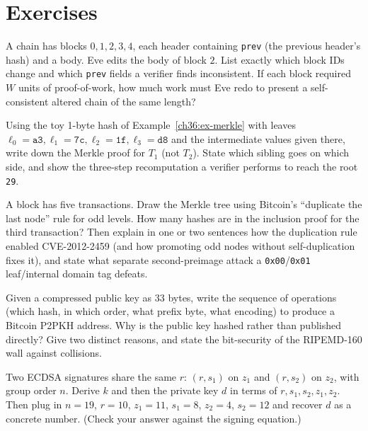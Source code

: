 \section*{Exercises}

\begin{exercise}
\label{ch36:ex-cascade}
A chain has blocks $0,1,2,3,4$, each header containing \texttt{prev} (the previous header's hash) and a body. Eve edits the body of block $2$. List exactly which block IDs change and which \texttt{prev} fields a verifier finds inconsistent. If each block required $W$ units of proof-of-work, how much work must Eve redo to present a self-consistent altered chain of the same length?
\end{exercise}

\begin{exercise}
\label{ch36:ex-merkleproof}
Using the toy 1-byte hash of Example~\ref{ch36:ex-merkle} with leaves $\ell_0=\texttt{a3},\ell_1=\texttt{7c},\ell_2=\texttt{1f},\ell_3=\texttt{d8}$ and the intermediate values given there, write down the Merkle proof for $T_1$ (not $T_2$). State which sibling goes on which side, and show the three-step recomputation a verifier performs to reach the root \texttt{29}.
\end{exercise}

\begin{exercise}
\label{ch36:ex-oddleaves}
A block has five transactions. Draw the Merkle tree using Bitcoin's ``duplicate the last node'' rule for odd levels. How many hashes are in the inclusion proof for the third transaction? Then explain in one or two sentences how the duplication rule enabled CVE-2012-2459 (and how promoting odd nodes without self-duplication fixes it), and state what separate second-preimage attack a \texttt{0x00}/\texttt{0x01} leaf/internal domain tag defeats.
\end{exercise}

\begin{exercise}
\label{ch36:ex-address}
Given a compressed public key as $33$ bytes, write the sequence of operations (which hash, in which order, what prefix byte, what encoding) to produce a Bitcoin P2PKH address. Why is the public key hashed rather than published directly? Give two distinct reasons, and state the bit-security of the RIPEMD-160 wall against collisions.
\end{exercise}

\begin{exercise}
\label{ch36:ex-noncereuse}
Two ECDSA signatures share the same $r$: $(r,s_1)$ on $z_1$ and $(r,s_2)$ on $z_2$, with group order $n$. Derive $k$ and then the private key $d$ in terms of $r, s_1, s_2, z_1, z_2$. Then plug in $n=19$, $r=10$, $z_1=11$, $s_1=8$, $z_2=4$, $s_2=12$ and recover $d$ as a concrete number. (Check your answer against the signing equation.)
\end{exercise}

